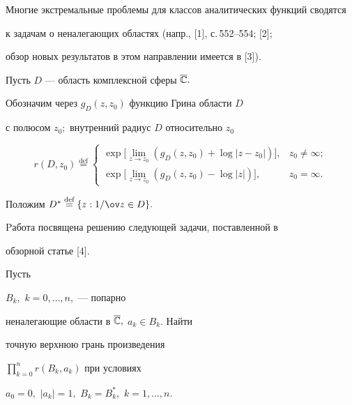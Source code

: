 

\maketitle


\label{begin}





Многие экстремальные проблемы для классов аналитических функций сводятся


к задачам о неналегающих областях (напр., [1], с.\,552--554; [2];


обзор новых результатов в этом направлении имеется в [3]).


Пусть $D$ --- область комплексной сферы $\overline{\Bbb C}.$


Обозначим через $g_{D}(z,z_0)$ функцию Грина области $D$


с полюсом $z_0;$ внутренний радиус $D$ относительно $z_0$


$$


r(D,z_0)\overset{\text{def}}{=}{}


\begin{cases}


\exp\big[\lim\limits_{z\to z_0}


(g_{D}(z,z_0)+\log|z-z_0|)\big],& z_0\ne\infty; \\


\exp\big[\lim\limits_{z\to z_0}


(g_{D}(z,z_0)-\log|z|)\big],& z_0=\infty.


\end{cases}


$$


Положим $D^*\overset{\text{def}}{=}{}\{z:1/\ov z\in D\}.$





Pабота посвящена решению следующей задачи, поставленной в


обзорной статье [4].


Пусть


$B_k,$ $k=0,\dotsc,n,$ --- попарно


неналегающие области в $\overline{\Bbb C},$ $a_k\in B_k.$ Найти


точную верхнюю грань произведения


$\prod\limits_{k=0}^{n}r(B_k,a_k)$ при условиях


$a_0=0,$ $|a_k|=1,$ $B_k=B_k^*,$ $k=1,\dotsc,n.$


